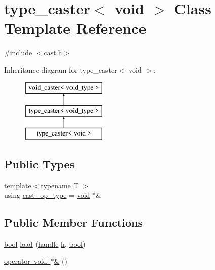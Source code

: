\hypertarget{classtype__caster_3_01void_01_4}{}\section{type\+\_\+caster$<$ void $>$ Class Template Reference}
\label{classtype__caster_3_01void_01_4}


{\ttfamily \#include $<$cast.\+h$>$}

Inheritance diagram for type\+\_\+caster$<$ void $>$\+:\begin{figure}[H]
\begin{center}
\leavevmode
\includegraphics[height=3.000000cm]{classtype__caster_3_01void_01_4}
\end{center}
\end{figure}
\subsection*{Public Types}
\begin{DoxyCompactItemize}
\item 
{\footnotesize template$<$typename T $>$ }\\using \mbox{\hyperlink{classtype__caster_3_01void_01_4_a334e9bada1b4be4c9b42fe4f1e1784a4}{cast\+\_\+op\+\_\+type}} = \mbox{\hyperlink{_s_d_l__opengles2__gl2ext_8h_ae5d8fa23ad07c48bb609509eae494c95}{void}} $\ast$\&
\end{DoxyCompactItemize}
\subsection*{Public Member Functions}
\begin{DoxyCompactItemize}
\item 
\mbox{\hyperlink{asdl_8h_af6a258d8f3ee5206d682d799316314b1}{bool}} \mbox{\hyperlink{classtype__caster_3_01void_01_4_a0059efa286541d97ac65bb84cd22b93d}{load}} (\mbox{\hyperlink{classhandle}{handle}} \mbox{\hyperlink{_s_d_l__opengl__glext_8h_afa0fb1b5e976920c0abeff2dca3ed774}{h}}, \mbox{\hyperlink{asdl_8h_af6a258d8f3ee5206d682d799316314b1}{bool}})
\item 
\mbox{\hyperlink{classtype__caster_3_01void_01_4_adc394a95bcc81e382ac81ad44039a072}{operator void $\ast$\&}} ()
\end{DoxyCompactItemize}

